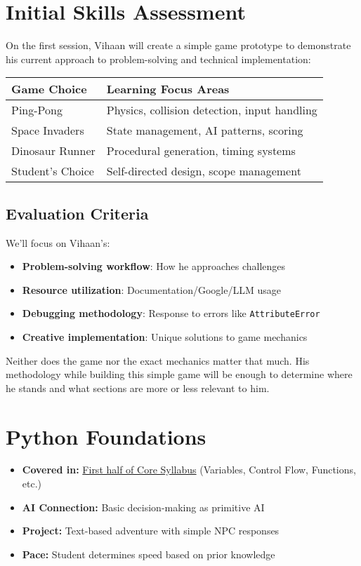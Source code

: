 \documentclass{article}
\begin{document}
\section{Initial Skills Assessment}
On the first session, Vihaan will create a simple game prototype to demonstrate his current approach to problem-solving and technical implementation:

\begin{center}
\begin{tabular}{|l|l|}
\hline
\textbf{Game Choice} & \textbf{Learning Focus Areas} \\
\hline
Ping-Pong & Physics, collision detection, input handling \\
\hline
Space Invaders & State management, AI patterns, scoring \\
\hline
Dinosaur Runner & Procedural generation, timing systems \\
\hline
Student's Choice & Self-directed design, scope management \\
\hline
\end{tabular}
\end{center}

\subsection*{Evaluation Criteria}
We'll focus on Vihaan's:
\begin{itemize}
\item \textbf{Problem-solving workflow}: How he approaches challenges
\item \textbf{Resource utilization}: Documentation/Google/LLM usage
\item \textbf{Debugging methodology}: Response to errors like \texttt{AttributeError}
\item \textbf{Creative implementation}: Unique solutions to game mechanics
\end{itemize}

Neither does the game nor the exact mechanics matter that much. His methodology while building this simple game will be enough to determine where he stands and what sections are more or less relevant to him.

\section{Python Foundations}
\begin{itemize}[nosep]
    \item \textbf{Covered in:} \href{https://codeabode.co/Syllabus.pdf}{First half of Core Syllabus} (Variables, Control Flow, Functions, etc.)
    \item \textbf{AI Connection:} Basic decision-making as primitive AI
    \item \textbf{Project:} Text-based adventure with simple NPC responses
    \item \textbf{Pace:} Student determines speed based on prior knowledge
\end{itemize}
\end{document}
